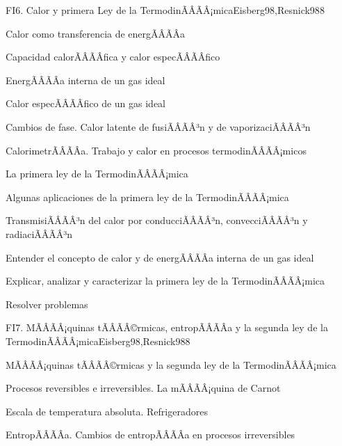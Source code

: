 \begin{sumilla}
\begin{unit}{FI6. Calor y primera Ley de la TermodinÃÂÃÂ¡mica}{Eisberg98,Resnick98}{8}
\begin{topicos}
         \item  Calor como transferencia de energÃÂÃÂ­a
	 \item  Capacidad calorÃÂÃÂ­fica y calor especÃÂÃÂ­fico
         \item  EnergÃÂÃÂ­a interna de un gas ideal
	 \item  Calor especÃÂÃÂ­fico de un gas ideal
         \item  Cambios de fase. Calor latente de fusiÃÂÃÂ³n y de vaporizaciÃÂÃÂ³n
	 \item  CalorimetrÃÂÃÂ­a. Trabajo y calor en procesos termodinÃÂÃÂ¡micos
         \item  La primera ley de la TermodinÃÂÃÂ¡mica
	 \item  Algunas aplicaciones de la primera ley de la TermodinÃÂÃÂ¡mica
         \item  TransmisiÃÂÃÂ³n del calor por conducciÃÂÃÂ³n, convecciÃÂÃÂ³n y radiaciÃÂÃÂ³n
   \end{topicos}

   \begin{objetivos}
         \item  Entender el concepto de calor y de energÃÂÃÂ­a interna de un gas ideal
         \item  Explicar, analizar y caracterizar la primera ley de la TermodinÃÂÃÂ¡mica
         \item  Resolver problemas
   \end{objetivos}
\end{unit}

\begin{unit}{FI7. MÃÂÃÂ¡quinas tÃÂÃÂ©rmicas, entropÃÂÃÂ­a y la segunda ley de la TermodinÃÂÃÂ¡mica}{Eisberg98,Resnick98}{8}
\begin{topicos}
         \item  MÃÂÃÂ¡quinas tÃÂÃÂ©rmicas y la segunda ley de la TermodinÃÂÃÂ¡mica
	 \item  Procesos reversibles e irreversibles. La mÃÂÃÂ¡quina de Carnot
         \item  Escala de temperatura absoluta. Refrigeradores
	 \item  EntropÃÂÃÂ­a. Cambios de entropÃÂÃÂ­a en procesos irreversibles
   \end{topicos}


\end{unit}
\end{sumilla}
